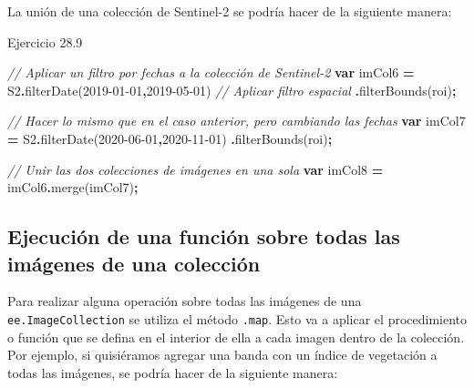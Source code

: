 \documentclass[
  12pt,
  letterpaper,
  twoside]{book}
\newenvironment{Shaded}{\begin{snugshade}}{\end{snugshade}}
\newcommand{\CommentTok}[1]{\textcolor[rgb]{0.56,0.35,0.01}{\textit{#1}}}
\newcommand{\FunctionTok}[1]{\textcolor[rgb]{0.00,0.00,0.00}{#1}}
\newcommand{\KeywordTok}[1]{\textcolor[rgb]{0.13,0.29,0.53}{\textbf{#1}}}
\newcommand{\NormalTok}[1]{#1}
\newcommand{\OperatorTok}[1]{\textcolor[rgb]{0.81,0.36,0.00}{\textbf{#1}}}
\newcommand{\StringTok}[1]{\textcolor[rgb]{0.31,0.60,0.02}{#1}}
\begin{document}
La unión de una colección de Sentinel-2 se podría hacer de la siguiente manera:

Ejercicio 28.9

\begin{Shaded}
\begin{Highlighting}[]
\CommentTok{// Aplicar un filtro por fechas a la colección de Sentinel{-}2}
\KeywordTok{var}\NormalTok{ imCol6 }\OperatorTok{=}\NormalTok{ S2}\OperatorTok{.}\FunctionTok{filterDate}\NormalTok{(}\StringTok{\textquotesingle{}2019{-}01{-}01\textquotesingle{}}\OperatorTok{,}\StringTok{\textquotesingle{}2019{-}05{-}01\textquotesingle{}}\NormalTok{)}
  \CommentTok{// Aplicar filtro espacial}
  \OperatorTok{.}\FunctionTok{filterBounds}\NormalTok{(roi)}\OperatorTok{;}

\CommentTok{// Hacer lo mismo que en el caso anterior, pero cambiando las fechas}
\KeywordTok{var}\NormalTok{ imCol7 }\OperatorTok{=}\NormalTok{ S2}\OperatorTok{.}\FunctionTok{filterDate}\NormalTok{(}\StringTok{\textquotesingle{}2020{-}06{-}01\textquotesingle{}}\OperatorTok{,}\StringTok{\textquotesingle{}2020{-}11{-}01\textquotesingle{}}\NormalTok{)}
  \OperatorTok{.}\FunctionTok{filterBounds}\NormalTok{(roi)}\OperatorTok{;}

\CommentTok{// Unir las dos colecciones de imágenes en una sola  }
\KeywordTok{var}\NormalTok{ imCol8 }\OperatorTok{=}\NormalTok{ imCol6}\OperatorTok{.}\FunctionTok{merge}\NormalTok{(imCol7)}\OperatorTok{;}
\end{Highlighting}
\end{Shaded}

\hypertarget{ejecuciuxf3n-de-una-funciuxf3n-sobre-todas-las-imuxe1genes-de-una-colecciuxf3n}{%
\subsection*{Ejecución de una función sobre todas las imágenes de una colección}\label{ejecuciuxf3n-de-una-funciuxf3n-sobre-todas-las-imuxe1genes-de-una-colecciuxf3n}}

Para realizar alguna operación sobre todas las imágenes de una \texttt{ee.ImageCollection} se utiliza el método \texttt{.map}. Esto va a aplicar el procedimiento o función que se defina en el interior de ella a cada imagen dentro de la colección. Por ejemplo, si quisiéramos agregar una banda con un índice de vegetación a todas las imágenes, se podría hacer de la siguiente manera:
\end{document}
